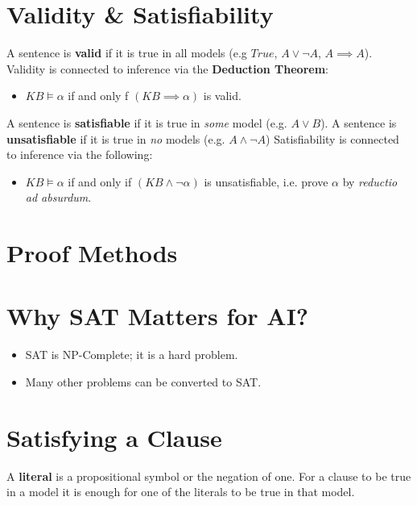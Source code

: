 \documentclass[11pt]{article}
\begin{document}
\section{Validity \& Satisfiability}
\label{sec:orge996c99}
A sentence is \textbf{valid} if it is true in all models (e.g \(True\), \(A\lor\neg A\), \(A\implies A\)).
Validity is connected to inference via the \textbf{Deduction Theorem}:
\begin{itemize}
\item \(KB \models \alpha\) if and only f \((KB \implies \alpha)\) is valid.
\end{itemize}
A sentence is \textbf{satisfiable} if it is true in \emph{some} model (e.g. \(A\lor B\)).
A sentence is \textbf{unsatisfiable} if it is true in \emph{no} models (e.g. \(A\land \neg A\))
Satisfiability is connected to inference via the following:
\begin{itemize}
\item \(KB \models \alpha\) if and only if \((KB \land \neg \alpha)\) is unsatisfiable, i.e. prove \(\alpha\) by \emph{reductio ad absurdum}.
\end{itemize}

\section{Proof Methods}
\label{sec:org12fc565}

\maketitle
\tableofcontents


\section{Why SAT Matters for AI?}
\label{sec:org796256c}
\begin{itemize}
\item SAT is NP-Complete; it is a hard problem.
\item Many other problems can be converted to SAT.
\end{itemize}

\section{Satisfying a Clause}
\label{sec:org0691404}
A \textbf{literal} is a propositional symbol or the negation of one.
For a clause to be true in a model it is enough for one of the literals to be true in that model.
\end{document}
